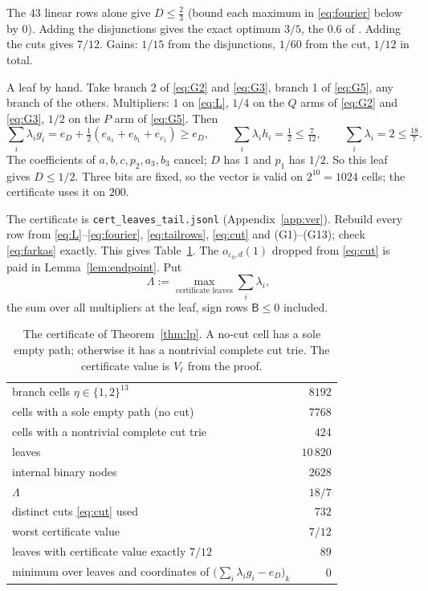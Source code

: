 \documentclass{amsart}
\numberwithin{equation}{section}
\numberwithin{table}{section}
\begin{document}
The $43$ linear rows alone give $D\le\tfrac23$ (bound each maximum in
\eqref{eq:fourier} below by $0$). Adding the disjunctions gives the exact
optimum $3/5$, the $0.6$ of \cite[Theorem~1.3]{BBLT}. Adding the cuts gives
$7/12$. Gains: $1/15$ from the disjunctions, $1/60$ from the cut, $1/12$ in
total.

A leaf by hand. Take branch 2 of \eqref{eq:G2} and \eqref{eq:G3}, branch 1
of \eqref{eq:G5}, any branch of the others. Multipliers: $1$ on \eqref{eq:L},
$1/4$ on the $Q$ arms of \eqref{eq:G2} and \eqref{eq:G3}, $1/2$ on the $P$ arm
of \eqref{eq:G5}. Then
\[
 \sum_i\lambda_i g_i
 =e_D+\tfrac12(e_{a_1}+e_{b_1}+e_{c_1})\ge e_D,
 \qquad
 \sum_i\lambda_i h_i=\tfrac12\le\tfrac7{12},
 \qquad
 \sum_i\lambda_i=2\le\tfrac{18}{7}.
\]
The coefficients of $a,b,c,p_2,a_3,b_3$ cancel; $D$ has $1$ and $p_1$ has
$1/2$. So this leaf gives $D\le1/2$. Three bits are fixed, so the vector is
valid on $2^{10}=1024$ cells; the certificate uses it on $200$.

The certificate is \texttt{cert\_leaves\_tail.jsonl} (Appendix~\ref{app:ver}).
Rebuild every row from \eqref{eq:L}--\eqref{eq:fourier}, \eqref{eq:tailrows},
\eqref{eq:cut} and (G1)--(G13); check \eqref{eq:farkas} exactly. This gives
Table~\ref{tab:cert}. The $o_{\varepsilon_0,d}(1)$ dropped from \eqref{eq:cut}
is paid in Lemma~\ref{lem:endpoint}. Put
\begin{equation*}
 \Lambda:=\max_{\text{certificate leaves}}\sum_i\lambda_i,
\end{equation*}
the sum over all multipliers at the leaf, sign rows $\mathsf B\le0$
included.

\begin{table}[ht]
\centering\small
\caption{The certificate of Theorem~\ref{thm:lp}. A no-cut cell has a sole
empty path; otherwise it has a nontrivial complete cut trie. The certificate
value is $V_\ell$ from the proof.}\label{tab:cert}
\begin{tabular}{@{}lr@{}}
\hline branch cells $\eta\in\{1,2\}^{13}$ & $8192$\\
cells with a sole empty path (no cut) & $7768$\\
cells with a nontrivial complete cut trie & $424$\\
leaves & $10\,820$\\
internal binary nodes & $2628$\\
$\Lambda$ & $18/7$\\
distinct cuts \eqref{eq:cut} used & $732$\\
worst certificate value & $7/12$\\
leaves with certificate value exactly $7/12$ & $89$\\
minimum over leaves and coordinates of
$\bigl(\sum_i\lambda_i g_i-e_D\bigr)_k$ & $0$\\
\hline
\end{tabular}
\end{table}
\end{document}
